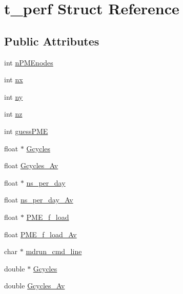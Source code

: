 \hypertarget{structt__perf}{\section{t\-\_\-perf \-Struct \-Reference}
\label{structt__perf}
}
\subsection*{\-Public \-Attributes}
\begin{DoxyCompactItemize}
\item 
int \hyperlink{structt__perf_a2514846e9314e7e5150abc458324370c}{n\-P\-M\-Enodes}
\item 
int \hyperlink{structt__perf_a674c3c280363e1bc3c25d7973cc3ea80}{nx}
\item 
int \hyperlink{structt__perf_a83802e48fb61d6cdc67d7ccaabed25d5}{ny}
\item 
int \hyperlink{structt__perf_a20bfcf805e60bc6d45e74df1f3cb1670}{nz}
\item 
int \hyperlink{structt__perf_aa02e58a4651a343254235561d51a5461}{guess\-P\-M\-E}
\item 
float $\ast$ \hyperlink{structt__perf_a4fab4e6e488abcd62c5a43de2e0d6f57}{\-Gcycles}
\item 
float \hyperlink{structt__perf_a638c74dce848e84e8b504e0fbb7b301e}{\-Gcycles\-\_\-\-Av}
\item 
float $\ast$ \hyperlink{structt__perf_ae5055ba6fd689b466242f28a7c0c0c2a}{ns\-\_\-per\-\_\-day}
\item 
float \hyperlink{structt__perf_a94d1d8f02b34abcc6145ef0729476314}{ns\-\_\-per\-\_\-day\-\_\-\-Av}
\item 
float $\ast$ \hyperlink{structt__perf_a277a06d0201621ab6f3eaf413cdca05a}{\-P\-M\-E\-\_\-f\-\_\-load}
\item 
float \hyperlink{structt__perf_acc9fb3db5c5468fb2c0c861fdf9560dd}{\-P\-M\-E\-\_\-f\-\_\-load\-\_\-\-Av}
\item 
char $\ast$ \hyperlink{structt__perf_a8c7aa9ca0939b59a400b08f15f3dedee}{mdrun\-\_\-cmd\-\_\-line}
\item 
double $\ast$ \hyperlink{structt__perf_a03f95af83a63ca4ca7eed041e36dce98}{\-Gcycles}
\item 
double \hyperlink{structt__perf_a72470a46cefed6810e41b5ba939713cb}{\-Gcycles\-\_\-\-Av}
\end{DoxyCompactItemize}


